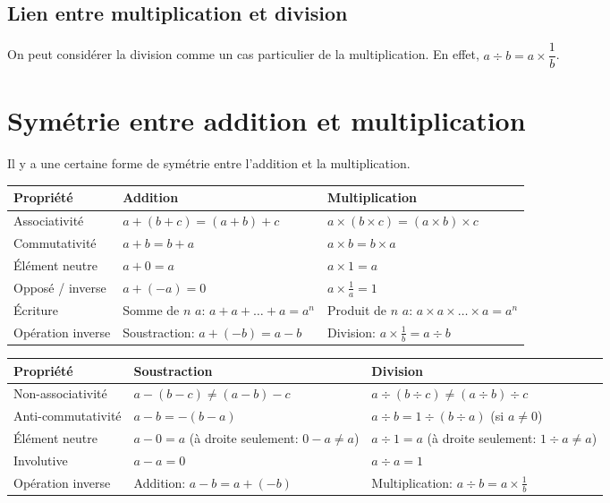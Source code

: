 \subsection{Lien entre multiplication et division}

On peut considérer la division comme un cas particulier de la multiplication. En effet, $a\div b = a \times \dfrac1b$.

\section{Symétrie entre addition et multiplication}

Il y a une certaine forme de symétrie entre l'addition et la multiplication.

\begin{table}[h]
    \centering
    \begin{tabular}{|P{3cm}|P{5cm}|P{5cm}|}
    \hline
    \textbf{Propriété} & \textbf{Addition} & \textbf{Multiplication} \\ \hline
    Associativité & $a+(b+c) = (a+b)+c$ & $a\times (b\times c) = (a\times b)\times c$ \\ \hline
    Commutativité & $a+b = b+a$ & $a\times b = b\times a$ \\ \hline
    Élément neutre & $a+0 = a$ & $a\times 1 = a$ \\ \hline
    Opposé / inverse & $a + (-a)  = 0$ & $a\times \frac1a = 1$ \\ \hline
    Écriture & Somme de $n$ $a$: $a+a+\dots+a = a^n$ & Produit de $n$ $a$: $a\times a \times \dots \times a = a^n$ \\ \hline
    Opération inverse & Soustraction: $a+(-b) = a-b$ & Division: $a\times \frac1b = a\div b$ \\ \hline
    \end{tabular}
\end{table}

\begin{table}[h]
    \centering
    \begin{tabular}{|P{3cm}|P{5cm}|P{5cm}|}
    \hline
    \textbf{Propriété} & \textbf{Soustraction} & \textbf{Division} \\ \hline
    Non-associativité & $a-(b-c) \not= (a-b)-c$ & $a\div (b\div c) \not= (a\div b)\div c$ \\ \hline
    Anti-commutativité & $a-b = -(b-a)$ & $a\div b = 1\div (b \div a)$ (si $a\not= 0$) \\ \hline
    Élément neutre & $a-0 = a$ (à droite seulement: $0-a \not= a$) & $a\div 1 = a$ (à droite seulement: $1\div a \not= a$) \\ \hline
    Involutive & $a - a  = 0$ & $a\div a = 1$ \\ \hline
    Opération inverse & Addition: $a-b = a+(-b)$ & Multiplication: $a\div b = a\times \frac1b$ \\ \hline
    \end{tabular}
\end{table}

